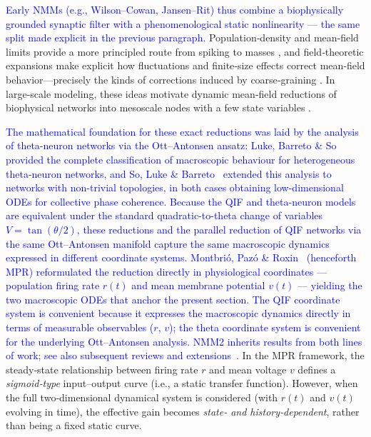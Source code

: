 \documentclass[12pt]{article}
\numberwithin{equation}{section}
\newcommand{\rev}[1]{\textcolor{blue}{#1}}
\begin{document}
\rev{Early NMMs (e.g., Wilson--Cowan, Jansen--Rit) thus combine a biophysically grounded synaptic filter with a phenomenological static nonlinearity --- the same split made explicit in the previous paragraph.}
Population‑density and mean‑field limits provide a more principled route from spiking to masses \cite{nykampPopulationDensityApproach2000, omurtagDynamicsNeuronalPopulations2000}, and field‑theoretic expansions make explicit how fluctuations and finite‑size effects correct mean‑field behavior—precisely the kinds of corrections induced by coarse‑graining \cite{buiceSystematicFluctuationExpansion2010}. In large‑scale modeling, these ideas motivate dynamic mean‑field reductions of biophysical networks into mesoscale nodes with a few state variables \cite{breakspearDynamicModelsLargescale2017}.


\rev{The mathematical foundation for these exact reductions was laid by the analysis of theta-neuron networks via the Ott--Antonsen ansatz: Luke, Barreto \& So~\cite{LukeBarretoSo2013} provided the complete classification of macroscopic behaviour for heterogeneous theta-neuron networks, and So, Luke \& Barreto~\cite{SoLukeBarreto2014} extended this analysis to networks with non-trivial topologies, in both cases obtaining low-dimensional ODEs for collective phase coherence. Because the QIF and theta-neuron models are equivalent under the standard quadratic-to-theta change of variables $V = \tan(\theta/2)$, these reductions and the parallel reduction of QIF networks via the same Ott--Antonsen manifold capture the same macroscopic dynamics expressed in different coordinate systems. Montbri\'o, Paz\'o \& Roxin~\cite{montbrioMacroscopicDescriptionNetworks2015} (henceforth MPR) reformulated the reduction directly in physiological coordinates --- population firing rate $r(t)$ and mean membrane potential $v(t)$ --- yielding the two macroscopic ODEs that anchor the present section. The QIF coordinate system is convenient because it expresses the macroscopic dynamics directly in terms of measurable observables ($r$, $v$); the theta coordinate system is convenient for the underlying Ott--Antonsen analysis. NMM2 inherits results from both lines of work; see also subsequent reviews and extensions~\cite{coombesNextGenerationNeural2019,byrneNextgenerationNeuralMass2020,coombesNextGenerationNeural2023,ruffiniAnalysisExtensionExact2022,clusellaComparisonExactHeuristic2023,bickUnderstandingDynamicsBiological2020}.}
In the MPR framework, the steady‐state relationship between firing rate \(r\) and mean voltage \(v\) defines a \emph{sigmoid‐type} input–output curve (i.e., a static transfer function).  
However, when the full two‐dimensional dynamical system is considered (with \(r(t)\) and \(v(t)\) evolving in time), the effective gain becomes \emph{state‐ and history‐dependent}, rather than being a fixed static curve.
\end{document}
